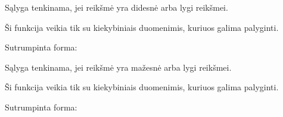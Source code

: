 \documentclass[letterpaper,10pt,lithuanian]{sphinxmanual}
\begin{document}
\begin{fulllineitems}
\begin{fulllineitems}
\begin{sphinxVerbatim}[commandchars=\\\{\}]
  
\end{sphinxVerbatim}

\sphinxAtStartPar
Sąlyga tenkinama, jei  reikšmė yra didesnė arba lygi  reikšmei.

\sphinxAtStartPar
Ši funkcija veikia tik su kiekybiniais duomenimis, kuriuos galima palyginti.

\end{fulllineitems}


\begin{fulllineitems}
\label{\detokenize{formules:id12}}
\pysigstartsignatures
\pysiglinewithargsret
{}
{\sphinxparamcomma {}}
{}
\pysigstopsignatures
\sphinxAtStartPar
Sutrumpinta forma:

\begin{sphinxVerbatim}[commandchars=\\\{\}]
  
\end{sphinxVerbatim}

\sphinxAtStartPar
Sąlyga tenkinama, jei  reikšmė yra mažesnė arba lygi  reikšmei.

\sphinxAtStartPar
Ši funkcija veikia tik su kiekybiniais duomenimis, kuriuos galima palyginti.

\end{fulllineitems}


\begin{fulllineitems}
\label{\detokenize{formules:in}}
\pysigstartsignatures
\pysiglinewithargsret
{}
{\sphinxparamcomma {}}
{}
\pysigstopsignatures
\sphinxAtStartPar
Sutrumpinta forma:


\end{fulllineitems}
\end{fulllineitems}
\end{document}
